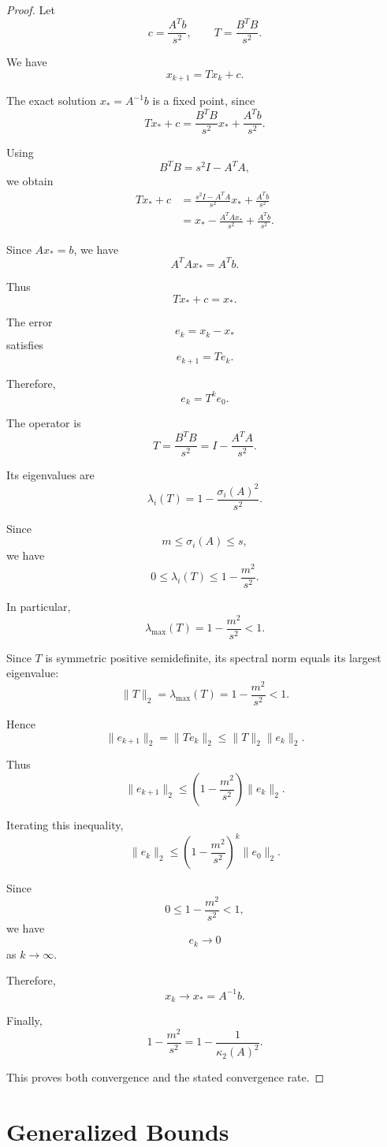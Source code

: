 \documentclass[11pt, reqno, a4paper]{amsart}
\theoremstyle{plain}
\theoremstyle{definition}
\theoremstyle{remark}
\numberwithin{equation}{section}
\begin{document}
\begin{proof}
Let
\[
c=\frac{A^Tb}{s^2},
\qquad
T=\frac{B^TB}{s^2}.
\]

We have
\[
x_{k+1}=Tx_k+c.
\]

The exact solution $x_*=A^{-1}b$ is a fixed point, since
\[
Tx_*+c
=
\frac{B^TB}{s^2}x_*
+
\frac{A^Tb}{s^2}.
\]

Using
\[
B^TB=s^2I-A^TA,
\]
we obtain
\begin{align*}
Tx_*+c
&=
\frac{s^2I-A^TA}{s^2}x_*
+
\frac{A^Tb}{s^2}\\
&=
x_*-\frac{A^TAx_*}{s^2}
+\frac{A^Tb}{s^2}.
\end{align*}

Since $Ax_*=b$, we have
\[
A^TAx_*=A^Tb.
\]

Thus
\[
Tx_*+c=x_*.
\]

The error
\[
e_k=x_k-x_*
\]
satisfies
\[
e_{k+1}=Te_k.
\]

Therefore,
\[
e_k=T^ke_0.
\]

The operator is
\[
T
=
\frac{B^TB}{s^2}
=
I-\frac{A^TA}{s^2}.
\]

Its eigenvalues are
\[
\lambda_i(T)
=
1-\frac{\sigma_i(A)^2}{s^2}.
\]

Since
\[
m\leq\sigma_i(A)\leq s,
\]
we have
\[
0\leq\lambda_i(T)
\leq
1-\frac{m^2}{s^2}.
\]

In particular,
\[
\lambda_{\max}(T)
=
1-\frac{m^2}{s^2}<1.
\]

Since $T$ is symmetric positive semidefinite, its spectral norm equals its largest eigenvalue:
\[
\|T\|_2
=
\lambda_{\max}(T)
=
1-\frac{m^2}{s^2}<1.
\]

Hence
\[
\|e_{k+1}\|_2
=
\|Te_k\|_2
\leq
\|T\|_2\|e_k\|_2.
\]

Thus
\[
\|e_{k+1}\|_2
\leq
\left(1-\frac{m^2}{s^2}\right)\|e_k\|_2.
\]

Iterating this inequality,
\[
\|e_k\|_2
\leq
\left(1-\frac{m^2}{s^2}\right)^k
\|e_0\|_2.
\]

Since
\[
0\leq1-\frac{m^2}{s^2}<1,
\]
we have
\[
e_k\to0
\]
as $k\to\infty$.

Therefore,
\[
x_k\to x_*=A^{-1}b.
\]

Finally,
\[
1-\frac{m^2}{s^2}
=
1-\frac{1}{\kappa_2(A)^2}.
\]

This proves both convergence and the stated convergence rate.
\end{proof}


\section{Generalized Bounds}
\end{document}
